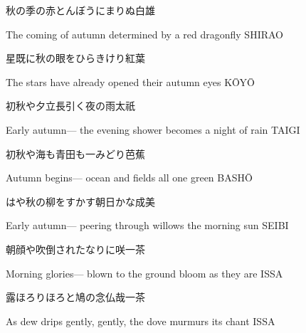 \begin{haiku}
    {\FH 秋の季の赤とんぼうにまりぬ}\hfill{\FH 白雄}

    \vin{} The coming of autumn
    \vin{} \vin{} determined
    \vin{} \vin{} \vin{} by a red dragonfly \hspace{\fill} SHIRAO
\end{haiku}

\begin{haiku}
    {\FH 星既に秋の眼をひらきけり}\hfill{\FH 紅葉}

    \vin{} The stars
    \vin{} \vin{} have already opened
    \vin{} \vin{} \vin{} their autumn eyes \hspace{\fill} K\={O}Y\={O}
\end{haiku}

\begin{haiku}
    {\FH 初秋や夕立長引く夜の雨}\hfill{\FH 太祇}

    \vin{} Early autumn---
    \vin{} \vin{} the evening shower becomes
    \vin{} \vin{} \vin{} a night of rain \hspace{\fill} TAIGI
\end{haiku}

\begin{haiku}
    {\FH 初秋や海も青田も一みどり}\hfill{\FH 芭蕉}

    \vin{} Autumn begins---
    \vin{} \vin{} ocean and fields
    \vin{} \vin{} \vin{} all one green \hspace{\fill} BASH\={O}
\end{haiku}

\begin{haiku}
    {\FH はや秋の柳をすかす朝日かな}\hfill{\FH 成美}

    \vin{} Early autumn---
    \vin{} \vin{} peering through willows
    \vin{} \vin{} \vin{} the morning sun \hspace{\fill} SEIBI
\end{haiku}

\begin{haiku}
    {\FH 朝顔や吹倒されたなりに咲}\hfill{\FH 一茶}

    \vin{} Morning glories---
    \vin{} \vin{} blown to the ground
    \vin{} \vin{} \vin{} bloom as they are \hspace{\fill} ISSA
\end{haiku}

\begin{haiku}
    {\FH 露ほろりほろと鳩の念仏哉}\hfill{\FH 一茶}

    \vin{} As dew drips
    \vin{} \vin{} gently, gently, the dove
    \vin{} \vin{} \vin{} murmurs its chant \hspace{\fill} ISSA
\end{haiku}

